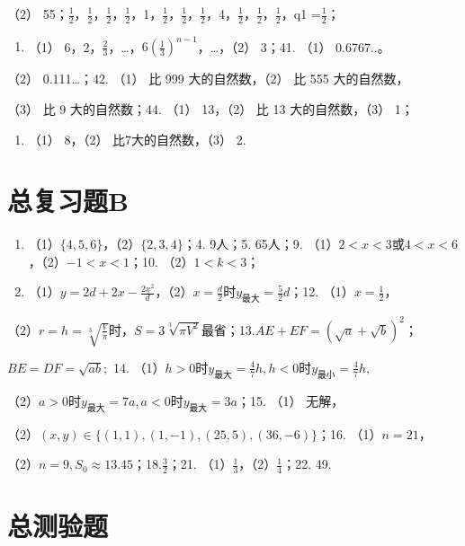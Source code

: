 （2）
55；\(\frac{1}{2}\)，\(\frac{1}{2}\)，\(\frac{1}{2}\)，\(\frac{1}{2}\)，1，\(\frac{1}{2}\)，\(\frac{1}{2}\)，\(\frac{1}{2}\)，4，\(\frac{1}{2}\)，\(\frac{1}{2}\)，\(\frac{1}{2}\)，q1
=\(\frac{1}{2}\)；

\begin{enumerate}[start=40]
\item
  （1）
  6，2，\(\frac{2}{3}\)，\ldots，\(6\left(\frac{1}{3}\right)^{n-1}\)，\ldots，（2）
  3；41. （1） 0.6767..。
\end{enumerate}

（2） 0.111\ldots；42. （1） 比 999 大的自然数，（2） 比 555
大的自然数，

（3） 比 9 大的自然数；44. （1） 13，（2） 比 13 大的自然数，（3） 1；

\begin{enumerate}[start=45]
\item
  （1） 8，（2） 比7大的自然数，（3） 2.
\end{enumerate}

\section{总复习题B}

\begin{enumerate}[start=3]
\item
  （1）\(\{4, 5, 6\}\)，（2）\(\{2, 3, 4\}\)；4. 9人；5. 65人；9.
  （1）\(2 < x < 3\)或\(4 < x < 6\)，（2）\(-1 < x < 1\)；10.
  （2）\(1 < k < 3\)；
\item
  （1）\(y = 2d + 2x - \frac{2x^2}{d}\)，（2）\(x = \frac{d}{2}\)时\(y_{\text{最大}} = \frac{5}{2} d\)；12.
  （1）\(x = \frac{1}{2}\)，
\end{enumerate}

（2）\(r = h = \sqrt[3]{\frac{V}{\pi}}\)时，\(S = 3\sqrt[3]{\pi V^2}\)最省；13.\(AE + EF = (\sqrt{a} + \sqrt{b})^2\)；

\(BE = DF = \sqrt{ab};\) 14.
（1）\(h > 0\)时\(y_{\text{最大}} = \frac{4}{7} h, h < 0\)时\(y_{\text{最小}} = \frac{4}{7} h,\)

（2）\(a > 0\)时\(y_{\text{最大}} = 7a, a < 0\)时\(y_{\text{最大}} = 3a\)；15.
（1） 无解，

（2）\((x, y) \in \{(1, 1), (1, -1), (25, 5), (36, -6)\}\)；16.
（1）\(n = 21\)，

（2）\(n = 9, S_0 \approx 13.45\)；18.\(\frac{3}{2}\)；21.
（1）\(\frac{1}{3}\)，（2）\(\frac{1}{4}\)；22. 49.

\section{总测验题}

